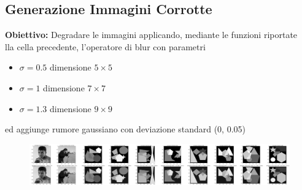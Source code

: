 \subsection{Generazione Immagini Corrotte}
\textbf{Obiettivo:}
Degradare le immagini applicando, mediante le funzioni riportate \\lla cella precedente,  l'operatore di blur con parametri
\begin{itemize}
    \item{$\sigma=0.5$ dimensione $5\times 5$}
    \item{$\sigma=1$ dimensione $7\times 7$}
    \item{$\sigma=1.3$ dimensione $9\times 9$}
\end{itemize}
ed aggiunge rumore gaussiano con deviazione standard (0, 0.05)

\begin{figure}[H]
    \centering
    \begin{minipage}[h]{\textwidth}
        \centering
        \includegraphics[width=\linewidth]{output/tabCorrotte/imgcorr1.png}\label{fig:imgcorrotte1}
    \end{minipage}
    \begin{minipage}[h]{0.55\textwidth}
        \centering
\end{minipage}
\end{figure}
